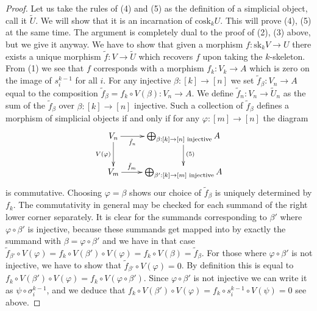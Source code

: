 \begin{proof}
\medskip\noindent
Let us take the rules of (4) and (5)
as the definition of a simplicial object, call it $\tilde U$.
We will show that it is an incarnation of $\text{cosk}_k U$.
This will prove (4), (5) at the same time. The argument is completely dual
to the proof of (2), (3) above, but we give it anyway.
We have to show
that given a morphism $f : \text{sk}_kV \to U$
there exists a unique morphism $\tilde f : V \to \tilde U$
which recovers $f$ upon taking the $k$-skeleton.
From (1) we see that $f$ corresponds with a morphism
$f_k : V_k \to A$ which is zero on the image of $s^{k - 1}_i$
for all $i$. For any injective $\beta : [k] \to [n]$
we set $\tilde f_\beta : V_n \to A$ equal to the composition
$\tilde f_\beta = f_k \circ V(\beta) : V_n \to A$. We define
$\tilde f_n : V_n \to \tilde U_n$ as the sum of
the $\tilde f_\beta$ over $\beta : [k] \to [n]$ injective.
Such a collection of $\tilde f_\beta$ defines a morphism
of simplicial objects if and only if
for any $\varphi : [m] \to [n]$ the diagram
$$
\xymatrix{
V_n
\ar[d]_{V(\varphi)}
\ar[r]_-{\tilde f_n}
&
\bigoplus_{\beta : [k] \to [n]\text{ injective}} A
\ar[d]^{(5)}
\\
V_m
\ar[r]^-{\tilde f_m}
&
\bigoplus_{\beta' : [k] \to [m]\text{ injective}} A
}
$$
is commutative. Choosing $\varphi = \beta$ shows our choice of
$\tilde f_\beta$ is uniquely determined by $f_k$.
The commutativity in general may be checked for each summand
of the right lower corner separately. It is clear for the
summands corresponding to $\beta'$ where
$\varphi \circ \beta'$ is injective, because these summands
get mapped into by exactly the summand with
$\beta = \varphi \circ \beta'$ and we have in that case
$\tilde f_{\beta'} \circ V(\varphi) =
f_k \circ V(\beta') \circ V(\varphi) =
f_k \circ V(\beta) = \tilde f_\beta$. For those where
$\varphi \circ \beta'$ is not injective,
we have to show that $\tilde f_{\beta'} \circ V(\varphi) = 0$.
By definition this is equal to
$f_k \circ V(\beta') \circ V(\varphi) =
f_k \circ V(\varphi \circ \beta')$.
Since $\varphi \circ \beta'$ is not injective we can write it
as $\psi \circ \sigma^{k - 1}_i$, and we deduce that
$f_k \circ V(\beta') \circ V(\varphi) =
f_k \circ s^{k - 1}_i \circ V(\psi) = 0$ see above.


\end{proof}
